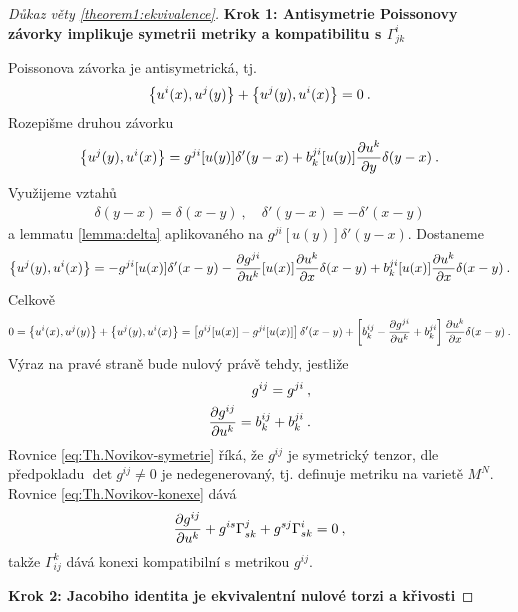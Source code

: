 \begin{proof}[Důkaz věty \ref{theorem1:ekvivalence}]
    \textbf{Krok 1: Antisymetrie Poissonovy závorky implikuje symetrii metriky a kompatibilitu s $\Gamma^i_{jk}$}

    Poissonova závorka je antisymetrická, tj.
    \begin{align}
        \left \lbrace u^i(x),u^j(y) \right \rbrace + \left \lbrace u^j(y),u^i(x) \right \rbrace = 0 \:.
    \end{align}
    Rozepišme druhou závorku
    \begin{align}
        \left \lbrace u^j(y),u^i(x) \right \rbrace =  g^{ji}[u(y)] \delta'(y-x) + b^{ji}_k[u(y)] \frac{\partial u^k}{\partial y} \delta(y-x) \:.
    \end{align}
    Využijeme vztahů
    \begin{align}
        \delta(y-x) = \delta(x-y) \:, \quad \delta'(y-x) = -\delta'(x-y)
    \end{align}
    a lemmatu \vref{lemma:delta} aplikovaného na $g^{ji}[u(y)]\delta'(y-x)$. Dostaneme
    \begin{align}
        \left \lbrace u^j(y),u^i(x) \right \rbrace 
        = - g^{ji} [u(x)] \delta'(x-y) - \frac{\partial g^{ji}}{\partial u^k}[u(x)] \frac{\partial u^k}{\partial x} \delta(x-y) + b^{ji}_k[u(x)] \frac{\partial u^k}{\partial x} \delta(x-y)
        \:.
    \end{align}
    Celkově
    \begin{align}
        0 = \left \lbrace u^i(x),u^j(y) \right \rbrace + \left \lbrace u^j(y),u^i(x) \right \rbrace = \left[ g^{ij}[u(x)]  - g^{ji}[u(x)] \right] \delta'(x-y) + \left[ b^{ij}_k - \frac{\partial g^{ji}}{\partial u^k}  + b^{ji}_k  \right] \frac{\partial u^k}{\partial x} \delta(x-y) \:.
    \end{align}
    Výraz na pravé straně bude nulový právě tehdy, jestliže
    \begin{align}
        g^{ij} = g^{ji} \:, \label{eq:Th.Novikov-symetrie} \\
        \frac{\partial g^{ij}}{\partial u^k} = b^{ij}_k + b^{ji}_k  \:. \label{eq:Th.Novikov-konexe}
    \end{align}
    Rovnice \eqref{eq:Th.Novikov-symetrie} říká, že $g^{ij}$ je symetrický tenzor, dle předpokladu $\det g^{ij} \neq 0$ je nedegenerovaný, tj. definuje metriku na varietě $M^N$. Rovnice \eqref{eq:Th.Novikov-konexe} dává
    \begin{align}
        \frac{\partial g^{ij}}{\partial u^k} + g^{is} \Gamma_{sk}^j + g^{sj} \Gamma_{sk}^i = 0 \:,
    \end{align}
    takže $\Gamma_{ij}^k$ dává konexi kompatibilní s metrikou $g^{ij}$.


    \textbf{Krok 2: Jacobiho identita je ekvivalentní nulové torzi a křivosti} 
    

\end{proof}
